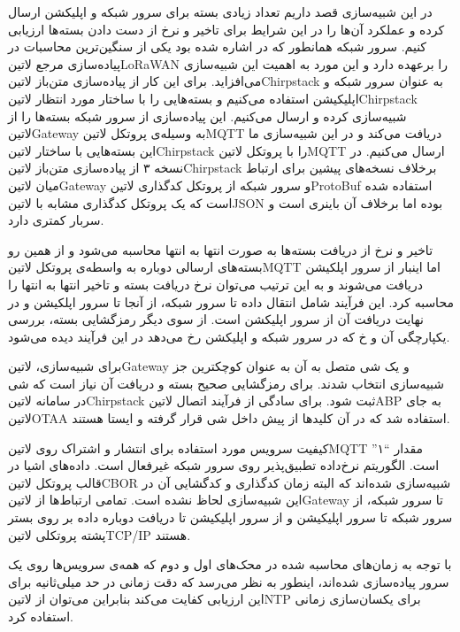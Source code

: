 
در این شبیه‌سازی قصد داریم تعداد زیادی بسته برای سرور شبکه و اپلیکشن ارسال کرده و عملکرد آن‌ها را در این شرایط برای تاخیر و نرخ از دست دادن بسته‌ها ارزیابی کنیم.
سرور شبکه همانطور که در  اشاره شده بود یکی از سنگین‌ترین محاسبات در پیاده‌سازی مرجع ‌لاتین{LoRaWAN} را برعهده دارد و این مورد به
اهمیت این شبیه‌سازی می‌افزاید.
برای این کار از پیاده‌سازی متن‌باز ‌لاتین{Chirpstack} به عنوان سرور شبکه و اپلیکیشن استفاده می‌کنیم و بسته‌هایی را با ساختار مورد انتظار
‌لاتین{Chirpstack} شبیه‌سازی کرده و ارسال می‌کنیم.
این پیاده‌سازی از سرور شبکه بسته‌ها را از ‌لاتین{Gateway} به وسیله‌ی پروتکل ‌لاتین{MQTT} دریافت می‌کند و در این شبیه‌سازی ما این بسته‌هایی با ساختار ‌لاتین{Chirpstack}
را با پروتکل ‌لاتین{MQTT} ارسال می‌کنیم.
در نسخه ۳ از پیاده‌سازی متن‌باز ‌لاتین{Chirpstack} برخلاف نسخه‌های پیشین برای ارتباط میان ‌لاتین{Gateway} و سرور شبکه از پروتکل کدگذاری ‌لاتین{ProtoBuf} استفاده شده است که یک پروتکل
کدگذاری مشابه با ‌لاتین{JSON} بوده اما برخلاف آن باینری است و سربار کمتری دارد.

تاخیر و نرخ از دریافت بسته‌ها به صورت انتها به انتها محاسبه می‌شود و از همین رو بسته‌های ارسالی دوباره به واسطه‌ی پروتکل ‌لاتین{MQTT} اما اینبار از سرور اپلکیشن
دریافت می‌شوند و به این ترتیب می‌توان نرخ دریافت بسته و تاخیر انتها به انتها را محاسبه کرد. این فرآیند شامل انتقال داده تا سرور شبکه، از آنجا تا سرور اپلکیشن و در نهایت
دریافت آن از سرور اپلیکشن است. از سوی دیگر رمزگشایی بسته، بررسی یکپارچگی آن و ‌خ که در سرور شبکه و اپلیکشن رخ می‌دهد در این فرآیند دیده می‌شود.

برای شبیه‌سازی، ‌لاتین{Gateway} و یک شی متصل به آن به عنوان کوچکترین جز شبیه‌سازی انتخاب شدند. برای رمزگشایی صحیح بسته و دریافت آن نیاز است
که شی در سامانه ‌لاتین{Chirpstack} ثبت شود. برای سادگی از فرآیند اتصال ‌لاتین{ABP} به جای ‌لاتین{OTAA} استفاده شد که در آن کلیدها از پیش
داخل شی قرار گرفته و ایستا هستند.

کیفیت سرویس مورد استفاده برای انتشار و اشتراک روی ‌لاتین{MQTT} مقدار ``۱'' است. الگوریتم نرخ‌داده تطبیق‌پذیر روی سرور شبکه غیرفعال است.
داده‌های اشیا در قالب پروتکل ‌لاتین{CBOR} شبیه‌سازی شده‌اند که البته زمان کدگذاری و کدگشایی آن در این شبیه‌سازی لحاظ نشده است.
تمامی ارتباط‌ها از ‌لاتین{Gateway} تا سرور شبکه، از سرور شبکه تا سرور اپلیکیشن و از سرور اپلیکیشن تا دریافت دوباره داده
بر روی بستر پشته پروتکلی ‌لاتین{TCP/IP} هستند.

با توجه به زمان‌های محاسبه شده در محک‌های اول و دوم که همه‌ی سرویس‌ها روی یک سرور پیاده‌سازی شده‌اند، اینطور به نظر می‌رسد که دقت زمانی در حد میلی‌ثانیه
برای این ارزیابی کفایت می‌کند بنابراین می‌توان از ‌لاتین{NTP} برای یکسان‌سازی زمانی استفاده کرد.

